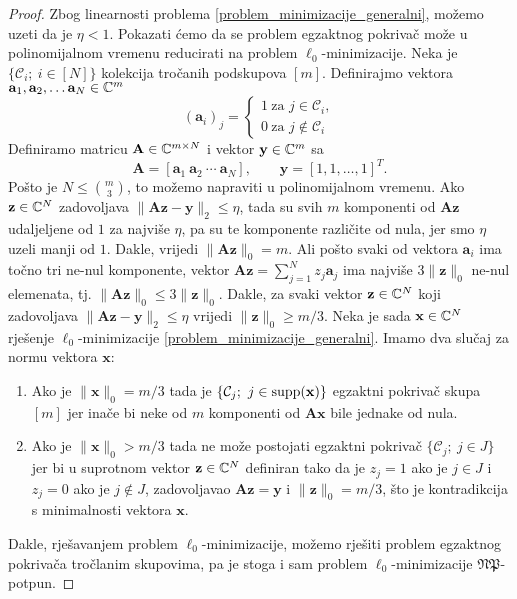 \documentclass[a4paper,twoside,12pt]{memoir} %
\newcommand{\vect}[1]{\mathbf{#1}}
\renewcommand{\vec}{\vect}
\newcommand{\supp}{\text{\normalfont{supp}}}
\newcommand{\norm}[1]{\|{#1}\|}
\begin{document}
\begin{proof}
    Zbog linearnosti problema \eqref{problem_minimizacije_generalni}, mo\v{z}emo uzeti da je $\eta < 1$. Pokazati \'cemo da se problem egzaktnog pokriva\v{c} mo\v{z}e u polinomijalnom vremenu reducirati na problem $\ell_0$-minimizacije. Neka je $\{\mathcal{C}_i;\ i \in [N]\}$ kolekcija tro\v{c}anih podskupova $[m]$. Definirajmo vektora $\vec a_1, \vec a_2,\dots \vec a_N \in \C^m$
    \begin{equation*}
        (\vec a_i)_j = 
        \begin{cases*}
            1\ \text{za } j \in \mathcal{C}_i,\\
            0\ \text{za } j \not\in \mathcal{C}_i
        \end{cases*}
    \end{equation*}
    Definiramo matricu $\vec A \in \C^{m \times N}$ i vektor $\vec y \in \C^m$ sa
    \begin{equation*}
        \vec A = [\vec a_1\ \vec a_2\ \cdots \ \vec a_N], \qquad \vec y = [1,1, \dots, 1]^T.
    \end{equation*}
    Po\v{s}to je $N \leq {m \choose 3}$, to mo\v{z}emo napraviti u polinomijalnom vremenu. Ako $\vec z \in \C^N$ zadovoljava $\norm{\vec{Az}-\vec y}_2 \leq \eta$, tada su svih $m$ komponenti od $\vec{Az}$ udaljeljene od $1$ za najvi\v{s}e $\eta$, pa su te komponente razli\v{c}ite od nula, jer smo $\eta$ uzeli manji od $1$. Dakle, vrijedi $\norm{\vec{Az}}_0 = m$. Ali po\v{s}to svaki od vektora $\vec a_i$ ima to\v{c}no tri ne-nul komponente, vektor $\vec{Az}=\sum_{j=1}^N z_j \vec a_j$ ima najvi\v{s}e $3 \norm{\vec z}_0$ ne-nul elemenata, tj. $\norm{\vec{Az}}_0 \leq 3 \norm{\vec{z}}_0$. Dakle, za svaki vektor $\vec z \in \C^N$ koji zadovoljava $\norm{\vec{Az}-\vec y}_2 \leq \eta$ vrijedi $\norm{\vec z}_0 \geq m/3$. Neka je sada $\vec x \in \C^N$ rje\v{s}enje $\ell_0$-minimizacije \eqref{problem_minimizacije_generalni}. Imamo dva slu\v{c}aj za normu vektora $\vec x$:
    \begin{enumerate}
        \item Ako je $\norm{\vec{x}}_0 = m/3$ tada je $\{\mathcal{C}_j;\ j \in \supp(\vec x)\}$ egzaktni pokriva\v{c} skupa $[m]$ jer ina\v{c}e bi neke od $m$ komponenti od $\vec{Ax}$ bile jednake od nula.
        \item Ako je $\norm{\vec{x}}_0 > m/3$ tada ne mo\v{z}e postojati egzaktni pokriva\v{c} $\{\mathcal{C}_j;\ j \in J\}$ jer bi u suprotnom vektor $\vec z \in \C^N$ definiran tako da je $z_j = 1$ ako je $j \in J$ i $z_j = 0$ ako je $j \not \in J$, zadovoljavao $\vec{Az}=\vec y$ i $\norm{\vec z}_0=m/3$, \v{s}to je kontradikcija s minimalnosti vektora $\vec x$.
    \end{enumerate}
    Dakle, rje\v{s}avanjem problem $\ell_0$-minimizacije, mo\v{z}emo rje\v{s}iti problem egzaktnog pokriva\v{c}a tro\v{c}lanim skupovima, pa je stoga i sam problem $\ell_0$-minimizacije $\mathfrak{NP}$-potpun.
\end{proof}
\end{document}
